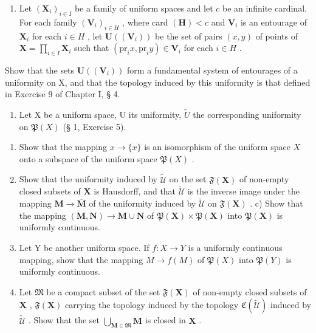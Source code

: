 \begin{enumerate}
\def\labelenumi{\arabic{enumi})}
\setcounter{enumi}{4}
\tightlist
\item
  Let \((\mathbf{X}_i)_{i\in I}\) be a family of uniform spaces and let \(c\) be an infinite cardinal. For each family \((\mathbf{V}_i)_{i\in H}\) , where card \((\mathbf{H}) < c\) and \(\mathbf{V}_i\) is an entourage of \(\mathbf{X}_i\) for each \(i\in H\) , let \(\mathbf{U}((\mathbf{V}_i))\) be the set of pairs \((x,y)\) of points of \(\mathbf{X} = \prod_{i \in I}\mathbf{X}_i\) such that \((\mathrm{pr}_i x, \mathrm{pr}_i y) \in \mathbf{V}_i\) for each \(i\in H\) .
\end{enumerate}

Show that the sets \(\mathbf{U}((\mathbf{V}_{i}))\) form a fundamental system of entourages of a uniformity on X, and that the topology induced by this uniformity is that defined in Exercise 9 of Chapter I, § 4.

\begin{enumerate}
\def\labelenumi{\arabic{enumi})}
\setcounter{enumi}{5}
\tightlist
\item
  Let X be a uniform space, U its uniformity, \(\tilde{U}\) the corresponding uniformity on \(\mathfrak{P}(X)\) (§ 1, Exercise 5).
\end{enumerate}

\begin{enumerate}
\def\labelenumi{\alph{enumi})}
\item
  Show that the mapping \(x \to \{x\}\) is an isomorphism of the uniform space \(X\) onto a subspace of the uniform space \(\mathfrak{P}(X)\) .
\item
  Show that the uniformity induced by \(\widetilde{\mathcal{U}}\) on the set \(\mathfrak{F}(\mathbf{X})\) of non-empty closed subsets of \(\mathbf{X}\) is Hausdorff, and that \(\widetilde{\mathcal{U}}\) is the inverse image under the mapping \(\mathbf{M} \to \overline{\mathbf{M}}\) of the uniformity induced by \(\widetilde{\mathcal{U}}\) on \(\mathfrak{F}(\mathbf{X})\) . c) Show that the mapping \((\mathbf{M}, \mathbf{N}) \to \mathbf{M} \cup \mathbf{N}\) of \(\mathfrak{P}(\mathbf{X}) \times \mathfrak{P}(\mathbf{X})\) into \(\mathfrak{P}(\mathbf{X})\) is uniformly continuous.
\item
  Let Y be another uniform space. If \(f: X \to Y\) is a uniformly continuous mapping, show that the mapping \(M \to f(M)\) of \(\mathfrak{P}(X)\) into \(\mathfrak{P}(Y)\) is uniformly continuous.
\item
  Let \(\mathfrak{M}\) be a compact subset of the set \(\mathfrak{F}(\mathbf{X})\) of non-empty closed subsets of \(\mathbf{X}\) , \(\mathfrak{F}(\mathbf{X})\) carrying the topology induced by the topology \(\mathfrak{C}(\tilde{\mathcal{U}})\) induced by \(\tilde{\mathcal{U}}\) . Show that the set \(\bigcup_{\mathbf{M} \in \mathfrak{M}} \mathbf{M}\) is closed in \(\mathbf{X}\) .
\end{enumerate}

